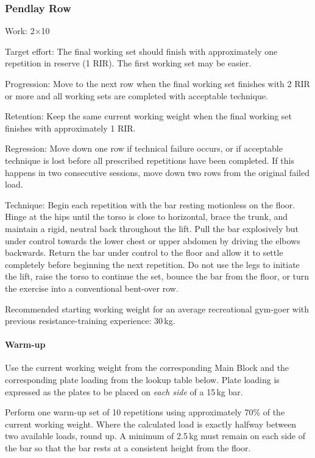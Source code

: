 \documentclass[11pt,a4paper]{article}
\begin{document}
\newpage
\subsubsection{Pendlay Row}

Work: 2$\times$10

Target effort: The final working set should finish with approximately one repetition in reserve (1 RIR). The first working set may be easier.

Progression: Move to the next row when the final working set finishes with 2 RIR or more and all working sets are completed with acceptable technique.

Retention: Keep the same current working weight when the final working set finishes with approximately 1 RIR.

Regression: Move down one row if technical failure occurs, or if acceptable technique is lost before all prescribed repetitions have been completed. If this happens in two consecutive sessions, move down two rows from the original failed load.

Technique: Begin each repetition with the bar resting motionless on the floor. Hinge at the hips until the torso is close to horizontal, brace the trunk, and maintain a rigid, neutral back throughout the lift. Pull the bar explosively but under control towards the lower chest or upper abdomen by driving the elbows backwards. Return the bar under control to the floor and allow it to settle completely before beginning the next repetition. Do not use the legs to initiate the lift, raise the torso to continue the set, bounce the bar from the floor, or turn the exercise into a conventional bent-over row.

Recommended starting working weight for an average recreational gym-goer with previous resistance-training experience: 30\,kg.

\paragraph{Warm-up}

Use the current working weight from the corresponding Main Block and the corresponding plate loading from the lookup table below. Plate loading is expressed as the plates to be placed on \emph{each side} of a 15\,kg bar.

Perform one warm-up set of 10 repetitions using approximately 70\% of the current working weight. Where the calculated load is exactly halfway between two available loads, round up. A minimum of 2.5\,kg must remain on each side of the bar so that the bar rests at a consistent height from the floor.
\end{document}

